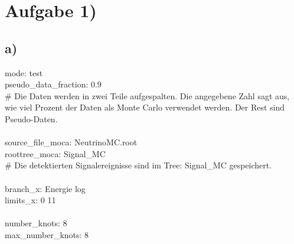 \section*{Aufgabe 1)}
\subsection{a)}
mode: test \\
pseudo_data_fraction: 0.9 \\
# Die Daten werden in zwei Teile aufgespalten. Die angegebene Zahl sagt aus, wie viel Prozent der Daten als Monte Carlo verwendet werden. Der Rest sind Pseudo-Daten. \\
\\
source_file_moca: NeutrinoMC.root \\
roottree_moca: Signal_MC \\
# Die detektierten Signalereignisse sind im Tree: Signal_MC gespeichert. \\
\\
branch_x: Energie log \\
limits_x: 0 11 \\
\\
number_knots: 8 \\
max_number_knots: 8 \\
